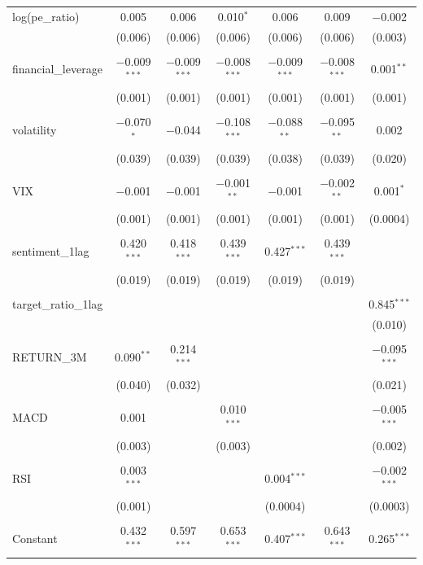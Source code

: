 \begin{table}[H]
{\begin{tabular}{@{\extracolsep{5pt}}lcccccc}
 log(pe\_ratio) & 0.005 & 0.006 & 0.010$^{*}$ & 0.006 & 0.009 & $-$0.002 \\ 
  & (0.006) & (0.006) & (0.006) & (0.006) & (0.006) & (0.003) \\ 
  & & & & & & \\ 
 financial\_leverage & $-$0.009$^{***}$ & $-$0.009$^{***}$ & $-$0.008$^{***}$ & $-$0.009$^{***}$ & $-$0.008$^{***}$ & 0.001$^{**}$ \\ 
  & (0.001) & (0.001) & (0.001) & (0.001) & (0.001) & (0.001) \\ 
  & & & & & & \\ 
 volatility & $-$0.070$^{*}$ & $-$0.044 & $-$0.108$^{***}$ & $-$0.088$^{**}$ & $-$0.095$^{**}$ & 0.002 \\ 
  & (0.039) & (0.039) & (0.039) & (0.038) & (0.039) & (0.020) \\ 
  & & & & & & \\ 
 VIX & $-$0.001 & $-$0.001 & $-$0.001$^{**}$ & $-$0.001 & $-$0.002$^{**}$ & 0.001$^{*}$ \\ 
  & (0.001) & (0.001) & (0.001) & (0.001) & (0.001) & (0.0004) \\ 
  & & & & & & \\ 
 sentiment\_1lag & 0.420$^{***}$ & 0.418$^{***}$ & 0.439$^{***}$ & 0.427$^{***}$ & 0.439$^{***}$ &  \\ 
  & (0.019) & (0.019) & (0.019) & (0.019) & (0.019) &  \\ 
  & & & & & & \\ 
 target\_ratio\_1lag &  &  &  &  &  & 0.845$^{***}$ \\ 
  &  &  &  &  &  & (0.010) \\ 
  & & & & & & \\ 
 RETURN\_3M & 0.090$^{**}$ & 0.214$^{***}$ &  &  &  & $-$0.095$^{***}$ \\ 
  & (0.040) & (0.032) &  &  &  & (0.021) \\ 
  & & & & & & \\ 
 MACD & 0.001 &  & 0.010$^{***}$ &  &  & $-$0.005$^{***}$ \\ 
  & (0.003) &  & (0.003) &  &  & (0.002) \\ 
  & & & & & & \\ 
 RSI & 0.003$^{***}$ &  &  & 0.004$^{***}$ &  & $-$0.002$^{***}$ \\ 
  & (0.001) &  &  & (0.0004) &  & (0.0003) \\ 
  & & & & & & \\ 
 Constant & 0.432$^{***}$ & 0.597$^{***}$ & 0.653$^{***}$ & 0.407$^{***}$ & 0.643$^{***}$ & 0.265$^{***}$ \\ 

\end{tabular}}
\end{table}
